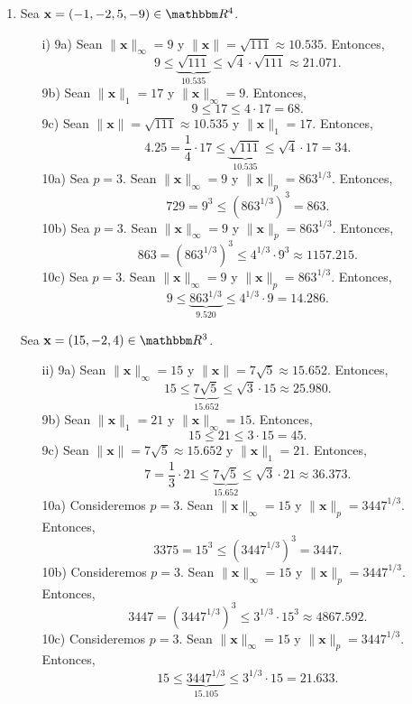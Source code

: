 \begin{enumerate}
\begin{enumerate}
    \end{enumerate}
    \item Sea $\mathbf{x} = (-1, -2, 5, -9) \in \RR[4]$.
    \begin{enumerate}
        \item[i)] 9a) Sean $\| \mathbf{x} \|_{\infty} = 9$ y $\| \mathbf{x} \| = \sqrt{111} \approx 10.535$. Entonces,
        $$9 \leq \underbrace{\sqrt{111}}_{10.535} \leq \sqrt{4} \cdot \sqrt{111} \approx 21.071.$$
        9b) Sean $\| \mathbf{x} \|_1 = 17$ y $\| \mathbf{x} \|_{\infty} = 9$. Entonces,
        $$9 \leq 17 \leq 4 \cdot 17 = 68.$$
        9c) Sean $\| \mathbf{x} \| = \sqrt{111} \approx 10.535$ y $\| \mathbf{x} \|_1 = 17$. Entonces,
        $$4.25 = \frac{1}{4} \cdot 17 \leq \underbrace{\sqrt{111}}_{10.535} \leq \sqrt{4} \cdot 17 = 34.$$
        10a) Sea $p = 3$. Sean $\| \mathbf{x} \|_{\infty} = 9$ y $\| \mathbf{x} \|_p = 863^{1/3}$. Entonces,
        $$729 = 9^3 \leq \left(863^{1/3}\right)^3 = 863.$$
        10b) Sea $p = 3$. Sean $\| \mathbf{x} \|_{\infty} = 9$ y $\| \mathbf{x} \|_p = 863^{1/3}$. Entonces,
        $$863 = \left(863^{1/3}\right)^3 \leq 4^{1/3} \cdot 9^3 \approx 1157.215.$$
        10c) Sea $p = 3$. Sean $\| \mathbf{x} \|_{\infty} = 9$ y $\| \mathbf{x} \|_p = 863^{1/3}$. Entonces,
        $$9 \leq \underbrace{863^{1/3}}_{9.520} \leq 4^{1/3} \cdot 9 = 14.286.$$
    \end{enumerate}
    Sea $\mathbf{x} = (15, -2, 4) \in \RR[3]$.
    \begin{enumerate}
        \item[ii)] 9a) Sean $\| \mathbf{x} \|_{\infty} = 15$ y $\| \mathbf{x} \| = 7\sqrt{5} \approx 15.652$. Entonces,
        $$15 \leq \underbrace{7\sqrt{5}}_{15.652} \leq \sqrt{3} \cdot 15 \approx 25.980.$$
        9b) Sean $\| \mathbf{x} \|_1 = 21$ y $\| \mathbf{x} \|_{\infty} = 15$. Entonces,
        $$15 \leq 21 \leq 3 \cdot 15 = 45.$$
        9c) Sean $\| \mathbf{x} \| = 7\sqrt{5} \approx 15.652$ y $\| \mathbf{x} \|_1 = 21$. Entonces,
        $$7 = \frac{1}{3} \cdot 21 \leq \underbrace{7\sqrt{5}}_{15.652} \leq \sqrt{3} \cdot 21 \approx 36.373.$$
        10a) Consideremos $p = 3$. Sean $\| \mathbf{x} \|_{\infty} = 15$ y $\| \mathbf{x} \|_p = 3447^{1/3}$. Entonces,
        $$3375 = 15^3 \leq \left(3447^{1/3}\right)^3 = 3447.$$
        10b) Consideremos $p = 3$. Sean $\| \mathbf{x} \|_{\infty} = 15$ y $\| \mathbf{x} \|_p = 3447^{1/3}$. Entonces,
        $$3447 = \left(3447^{1/3}\right)^3 \leq 3^{1/3} \cdot 15^3 \approx 4867.592.$$
        10c) Consideremos $p = 3$. Sean $\| \mathbf{x} \|_{\infty} = 15$ y $\| \mathbf{x} \|_p = 3447^{1/3}$. Entonces,
        $$15 \leq \underbrace{3447^{1/3}}_{15.105} \leq 3^{1/3} \cdot 15 = 21.633.$$
    \end{enumerate}
\end{enumerate}

